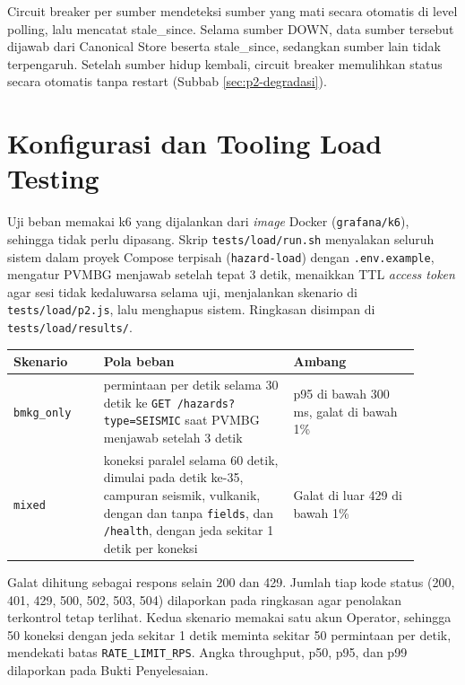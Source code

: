 Circuit breaker per sumber mendeteksi sumber yang mati secara otomatis di level polling, lalu mencatat stale\_since. Selama sumber DOWN, data sumber tersebut dijawab dari Canonical Store beserta stale\_since, sedangkan sumber lain tidak terpengaruh. Setelah sumber hidup kembali, circuit breaker memulihkan status secara otomatis tanpa restart (Subbab \ref{sec:p2-degradasi}).

\section{Konfigurasi dan Tooling Load Testing}

Uji beban memakai k6 yang dijalankan dari \textit{image} Docker (\texttt{grafana/k6}), sehingga tidak perlu dipasang. Skrip \texttt{tests/load/run.sh} menyalakan seluruh sistem dalam proyek Compose terpisah (\texttt{hazard-load}) dengan \texttt{.env.example}, mengatur PVMBG menjawab setelah tepat 3 detik, menaikkan TTL \textit{access token} agar sesi tidak kedaluwarsa selama uji, menjalankan skenario di \texttt{tests/load/p2.js}, lalu menghapus sistem. Ringkasan disimpan di \texttt{tests/load/results/}.

\begin{longtable}[]{|>{\raggedright\arraybackslash}p{0.2\linewidth}|>{\raggedright\arraybackslash}p{0.42\linewidth}|>{\raggedright\arraybackslash}p{0.28\linewidth}|}
\hline
Skenario & Pola beban & Ambang \\
\hline
\endhead
\texttt{bmkg\_only} & 20 permintaan per detik selama 30 detik ke \texttt{GET /hazards?type=SEISMIC} saat PVMBG menjawab setelah 3 detik & p95 di bawah 300 ms, galat di bawah 1\% \\
\hline
\texttt{mixed} & 50 koneksi paralel selama 60 detik, dimulai pada detik ke-35, campuran seismik, vulkanik, dengan dan tanpa \texttt{fields}, dan \texttt{/health}, dengan jeda sekitar 1 detik per koneksi & Galat di luar 429 di bawah 1\% \\
\hline
\end{longtable}

Galat dihitung sebagai respons selain 200 dan 429. Jumlah tiap kode status (200, 401, 429, 500, 502, 503, 504) dilaporkan pada ringkasan agar penolakan terkontrol tetap terlihat. Kedua skenario memakai satu akun Operator, sehingga 50 koneksi dengan jeda sekitar 1 detik meminta sekitar 50 permintaan per detik, mendekati batas \texttt{RATE\_LIMIT\_RPS}. Angka throughput, p50, p95, dan p99 dilaporkan pada Bukti Penyelesaian.
